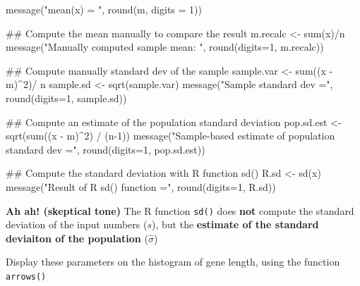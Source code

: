 \documentclass[]{article}
\newenvironment{Shaded}{\begin{snugshade}}{\end{snugshade}}
\newcommand{\KeywordTok}[1]{\textcolor[rgb]{0.94,0.87,0.69}{#1}}
\newcommand{\DataTypeTok}[1]{\textcolor[rgb]{0.87,0.87,0.75}{#1}}
\newcommand{\DecValTok}[1]{\textcolor[rgb]{0.86,0.86,0.80}{#1}}
\newcommand{\StringTok}[1]{\textcolor[rgb]{0.80,0.58,0.58}{#1}}
\newcommand{\OperatorTok}[1]{\textcolor[rgb]{0.94,0.94,0.82}{#1}}
\newcommand{\NormalTok}[1]{\textcolor[rgb]{0.80,0.80,0.80}{#1}}
\begin{document}
\begin{Shaded}
\begin{Highlighting}[]
\KeywordTok{message}\NormalTok{(}\StringTok{"mean(x) = "}\NormalTok{, }\KeywordTok{round}\NormalTok{(m, }\DataTypeTok{digits =} \DecValTok{1}\NormalTok{))}

\NormalTok{## Compute the mean manually to compare the result}
\NormalTok{m.recalc <-}\StringTok{ }\KeywordTok{sum}\NormalTok{(x)}\OperatorTok{/}\NormalTok{n}
\KeywordTok{message}\NormalTok{(}\StringTok{"Manually computed sample mean: "}\NormalTok{, }\KeywordTok{round}\NormalTok{(}\DataTypeTok{digits=}\DecValTok{1}\NormalTok{, m.recalc))}

\NormalTok{## Compute manually standard dev of the sample}
\NormalTok{sample.var <-}\StringTok{ }\KeywordTok{sum}\NormalTok{((x }\OperatorTok{-}\StringTok{ }\NormalTok{m)}\OperatorTok{^}\DecValTok{2}\NormalTok{)}\OperatorTok{/}\StringTok{ }\NormalTok{n}
\NormalTok{sample.sd <-}\StringTok{ }\KeywordTok{sqrt}\NormalTok{(sample.var)}
\KeywordTok{message}\NormalTok{(}\StringTok{"Sample standard dev ="}\NormalTok{, }\KeywordTok{round}\NormalTok{(}\DataTypeTok{digits=}\DecValTok{1}\NormalTok{, sample.sd))}

\NormalTok{## Compute an estimate of the population standard deviation}
\NormalTok{pop.sd.est <-}\StringTok{ }\KeywordTok{sqrt}\NormalTok{(}\KeywordTok{sum}\NormalTok{((x }\OperatorTok{-}\StringTok{ }\NormalTok{m)}\OperatorTok{^}\DecValTok{2}\NormalTok{) }\OperatorTok{/}\StringTok{ }\NormalTok{(n}\OperatorTok{-}\DecValTok{1}\NormalTok{))}
\KeywordTok{message}\NormalTok{(}\StringTok{"Sample-based estimate of population standard dev ="}\NormalTok{, }\KeywordTok{round}\NormalTok{(}\DataTypeTok{digits=}\DecValTok{1}\NormalTok{, pop.sd.est))}

\NormalTok{## Compute the standard deviation with R function sd()}
\NormalTok{R.sd <-}\StringTok{ }\KeywordTok{sd}\NormalTok{(x)}
\KeywordTok{message}\NormalTok{(}\StringTok{"Result of R sd() function ="}\NormalTok{, }\KeywordTok{round}\NormalTok{(}\DataTypeTok{digits=}\DecValTok{1}\NormalTok{, R.sd))}
\end{Highlighting}
\end{Shaded}

\textbf{Ah ah! (skeptical tone)} The R function \texttt{sd()} does
\textbf{not} compute the standard deviation of the input numbers
(\(s\)), but the \textbf{estimate of the standard deviaiton of the
population} (\(\hat{\sigma}\))

Display these parameters on the histogram of gene length, using the
function \texttt{arrows()}
\end{document}

